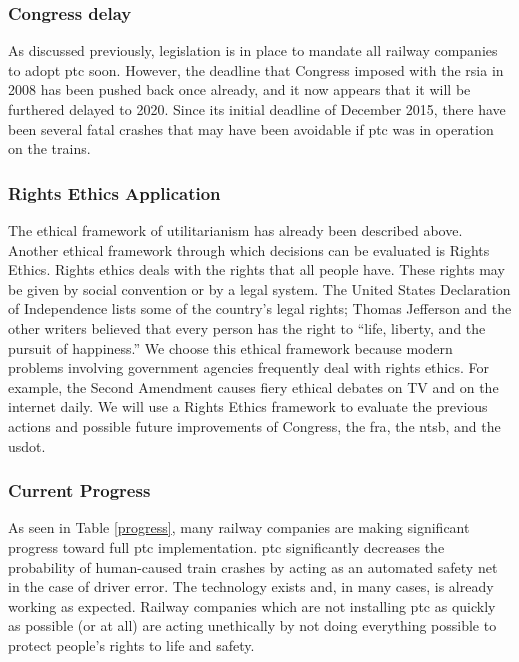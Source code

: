 \documentclass[11pt, titlepage]{article}
\begin{document}
\subsubsection{Congress delay}

As discussed previously, legislation is in place to mandate all railway companies to
adopt \gls{ptc} soon. However, the deadline that Congress imposed with the
\gls{rsia} in 2008 has been pushed back once already, and it now appears that it
will be furthered delayed to 2020. Since its initial deadline of December 2015,
there have been several fatal crashes that may have been avoidable if \gls{ptc} was
in operation on the trains.

\subsubsection{Rights Ethics Application}

The ethical framework of utilitarianism has already been described above. Another
ethical framework through which decisions can be evaluated is Rights Ethics. Rights
ethics deals with the rights that all people have. These rights may be given by
social convention or by a legal system. The United States Declaration of
Independence lists some of the country’s legal rights; Thomas Jefferson and the
other writers believed that every person has the right to ``life, liberty, and the
pursuit of happiness.'' We choose this ethical framework because modern problems
involving government agencies frequently deal with rights ethics. For example, the
Second Amendment causes fiery ethical debates on TV and on the internet daily. We
will use a Rights Ethics framework to evaluate the previous actions and possible
future improvements of Congress, the \gls{fra}, the \gls{ntsb}, and the
\gls{usdot}.

\subsubsection{Current Progress}

As seen in Table \ref{progress}, many railway companies are making significant
progress toward full \gls{ptc} implementation. \gls{ptc} significantly decreases the
probability of human-caused train crashes by acting as an automated safety net in
the case of driver error. The technology exists and, in many cases, is already
working as expected. Railway companies which are not installing \gls{ptc} as quickly
as possible (or at all) are acting unethically by not doing everything possible to
protect people’s rights to life and safety.
\end{document}
